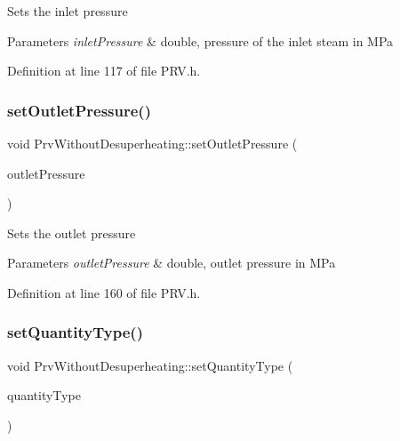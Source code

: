 Sets the inlet pressure


\begin{DoxyParams}{Parameters}
{\em inlet\+Pressure} & double, pressure of the inlet steam in M\+Pa \\
\hline
\end{DoxyParams}


Definition at line 117 of file P\+R\+V.\+h.

\mbox{\label{class_prv_without_desuperheating_a0f2a4597b58390e5c4a7c75b38bbebbc}} 
\subsubsection{\texorpdfstring{set\+Outlet\+Pressure()}{setOutletPressure()}}
{\footnotesize\ttfamily void Prv\+Without\+Desuperheating\+::set\+Outlet\+Pressure (\begin{DoxyParamCaption}\item[{double}]{outlet\+Pressure }\end{DoxyParamCaption})\hspace{0.3cm}{\ttfamily [inline]}}

Sets the outlet pressure


\begin{DoxyParams}{Parameters}
{\em outlet\+Pressure} & double, outlet pressure in M\+Pa \\
\hline
\end{DoxyParams}


Definition at line 160 of file P\+R\+V.\+h.

\mbox{\label{class_prv_without_desuperheating_a212177b7a16c7452358df4120196c04b}} 
\subsubsection{\texorpdfstring{set\+Quantity\+Type()}{setQuantityType()}}
{\footnotesize\ttfamily void Prv\+Without\+Desuperheating\+::set\+Quantity\+Type (\begin{DoxyParamCaption}\item[{\hyperlink{class_steam_properties_ae0294bedf7d178c2d8fb6aed0f62fbff}{Steam\+Properties\+::\+Thermodynamic\+Quantity}}]{quantity\+Type }\end{DoxyParamCaption})\hspace{0.3cm}{\ttfamily [inline]}}


